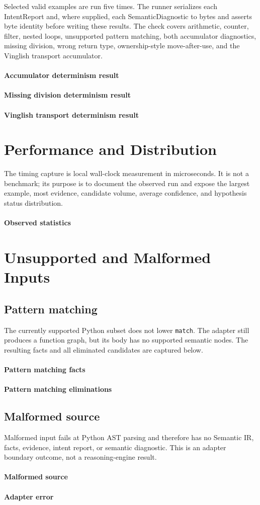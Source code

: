 \documentclass[10pt,a4paper]{article}
\newcommand{\artifact}[2]{\paragraph{#1}}
\begin{document}
Selected valid examples are run five times. The runner serializes each
IntentReport and, where supplied, each SemanticDiagnostic to bytes and asserts
byte identity before writing these results. The check covers arithmetic, counter,
filter, nested loops, unsupported pattern matching, both accumulator diagnostics,
missing division, wrong return type, ownership-style move-after-use, and the
Vinglish transport accumulator.

\artifact{Accumulator determinism result}{../gallery/accumulator/determinism.json}
\artifact{Missing division determinism result}{../gallery/missing_division/determinism.json}
\artifact{Vinglish transport determinism result}{../gallery/cross_language_vinglish_accumulator/determinism.json}

\section{Performance and Distribution}

The timing capture is local wall-clock measurement in microseconds. It is not a
benchmark; its purpose is to document the observed run and expose the largest
example, most evidence, candidate volume, average confidence, and hypothesis
status distribution.

\artifact{Observed statistics}{../gallery/statistics.json}

\section{Unsupported and Malformed Inputs}

\subsection{Pattern matching}
The currently supported Python subset does not lower \texttt{match}. The
adapter still produces a function graph, but its body has no supported semantic
nodes. The resulting facts and all eliminated candidates are captured below.
\artifact{Pattern matching facts}{../gallery/pattern_matching/facts.json}
\artifact{Pattern matching eliminations}{../gallery/pattern_matching/constraint-eliminations.json}

\subsection{Malformed source}
Malformed input fails at Python AST parsing and therefore has no Semantic IR,
facts, evidence, intent report, or semantic diagnostic. This is an adapter
boundary outcome, not a reasoning-engine result.
\artifact{Malformed source}{../gallery/malformed_input/source.py}
\artifact{Adapter error}{../gallery/malformed_input/adapter-error.txt}
\end{document}
